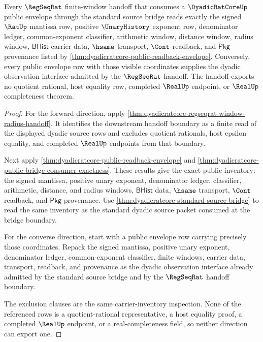 \begin{theorem}
\label{thm:dyadicratcore-regseqrat-bridge-handoff-exactness}
Every $\RegSeqRat$ finite-window handoff that consumes a
$\DyadicRatCoreUp$ public envelope through the standard source bridge reads
exactly the signed $\RatUp$ mantissa row, positive $\UnaryHistory$ exponent
row, denominator ledger, common-exponent classifier, arithmetic window,
distance window, radius window, $\mathsf{BHist}$ carrier data, $\hsame$
transport, $\Cont$ readback, and $\mathsf{Pkg}$ provenance listed by
\autoref{thm:dyadicratcore-public-readback-envelope}. Conversely, every public
envelope row with those visible coordinates supplies the dyadic observation
interface admitted by the $\RegSeqRat$ handoff. The handoff exports no quotient
rational, host equality row, completed $\RealUp$ endpoint, or $\RealUp$
completeness theorem.
\end{theorem}
\begin{proof}
For the forward direction, apply
\autoref{thm:dyadicratcore-regseqrat-window-radius-handoff}. It identifies the
downstream handoff boundary as a finite read of the displayed dyadic source
rows and excludes quotient rationals, host epsilon equality, and completed
$\RealUp$ endpoints from that boundary.

Next apply \autoref{thm:dyadicratcore-public-readback-envelope} and
\autoref{thm:dyadicratcore-public-bridge-consumer-exactness}. These results
give the exact public inventory: the signed mantissa, positive unary exponent,
denominator ledger, classifier, arithmetic, distance, and radius windows,
$\mathsf{BHist}$ data, $\hsame$ transport, $\Cont$ readback, and
$\mathsf{Pkg}$ provenance. Use
\autoref{thm:dyadicratcore-standard-source-bridge} to read the same inventory as
the standard dyadic source packet consumed at the bridge boundary.

For the converse direction, start with a public envelope row carrying precisely
those coordinates. Repack the signed mantissa, positive unary exponent,
denominator ledger, common-exponent classifier, finite windows, carrier data,
transport, readback, and provenance as the dyadic observation interface already
admitted by the standard source bridge and by the $\RegSeqRat$ handoff boundary.

The exclusion clauses are the same carrier-inventory inspection. None of the
referenced rows is a quotient-rational representative, a host equality proof, a
completed $\RealUp$ endpoint, or a real-completeness field, so neither direction
can export one.
\end{proof}

